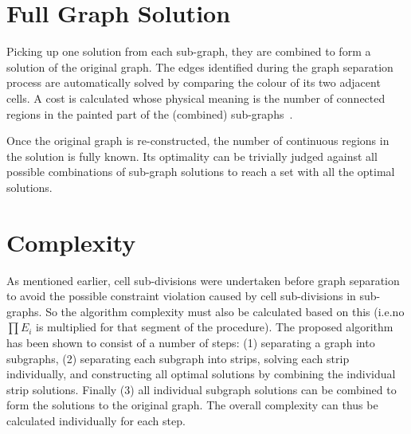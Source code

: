 \documentclass[conference]{IEEEtran}
\begin{document}
\section{Full Graph Solution}\label{section_full_graph}
Picking up one solution from each sub-graph, they are combined to form a solution of the original graph. 
The edges identified during the graph separation process are automatically solved by comparing the colour of its two adjacent cells. 
A cost is calculated whose physical meaning is the number of connected regions in the painted part of the (combined) sub-graphs~\cite{Yang2020Cellular}. 

Once the original graph is re-constructed, the number of continuous regions in the solution is fully known. Its optimality can be trivially judged against all possible combinations of sub-graph solutions to reach a set with all the optimal solutions. 

\section{Complexity}
\label{section_complexity}
As mentioned earlier, cell sub-divisions were undertaken before graph separation to avoid the possible  constraint violation caused by cell sub-divisions in sub-graphs. So the algorithm complexity must also be calculated based on this (i.e.no $\prod E_i$ is multiplied for that segment of the procedure).
The proposed algorithm has been shown to consist of a number of steps: (1) separating a graph into subgraphs, (2) separating each subgraph into strips, solving each strip individually, and  
constructing all optimal solutions by combining the individual strip solutions. Finally (3) all individual subgraph solutions can be combined to form the solutions to the original graph. 
The overall complexity can thus be calculated individually for each step. 
\end{document}
